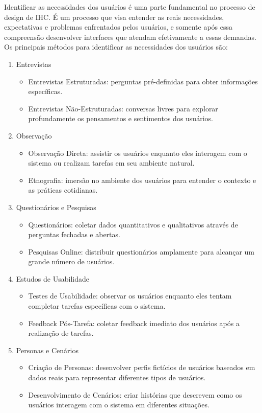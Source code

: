 \documentclass[
  12pt,
  openright,
  twoside,
  a4paper,
  english,
  french,
  spanish,
  brazil
]{abntex2}
\begin{document}
Identificar as necessidades dos usuários é uma parte fundamental no processo de
design de IHC. É um processo que visa entender as reais necessidades,
expectativas e problemas enfrentados pelos usuários, e somente após essa
compreensão desenvolver interfaces que atendam efetivamente a essas demandas. Os
principais métodos para identificar as necessidades dos usuários são:

\begin{enumerate}
  \item Entrevistas
  \begin{itemize}
    \item
      Entrevistas Estruturadas: perguntas pré-definidas para obter informações
      específicas.
    \item
      Entrevistas Não-Estruturadas: conversas livres para explorar profundamente
      os pensamentos e sentimentos dos usuários.
  \end{itemize}
  \item Observação
  \begin{itemize}
    \item
      Observação Direta: assistir os usuários enquanto eles interagem com o
      sistema ou realizam tarefas em seu ambiente natural.
    \item
      Etnografia: imersão no ambiente dos usuários para entender o contexto e as
      práticas cotidianas.
  \end{itemize}
  \item Questionários e Pesquisas
  \begin{itemize}
    \item
      Questionários: coletar dados quantitativos e qualitativos através de
      perguntas fechadas e abertas.
    \item
      Pesquisas Online: distribuir questionários amplamente para alcançar um
      grande número de usuários.
  \end{itemize}
  \item Estudos de Usabilidade
  \begin{itemize}
    \item
      Testes de Usabilidade: observar os usuários enquanto eles tentam completar
      tarefas específicas com o sistema.
    \item
      Feedback Pós-Tarefa: coletar feedback imediato dos usuários após a
      realização de tarefas.
  \end{itemize}
  \item Personas e Cenários
  \begin{itemize}
    \item
      Criação de Personas: desenvolver perfis fictícios de usuários baseados em
      dados reais para representar diferentes tipos de usuários.
    \item
      Desenvolvimento de Cenários: criar histórias que descrevem como os
      usuários interagem com o sistema em diferentes situações.
  \end{itemize}
\end{enumerate}
\end{document}
